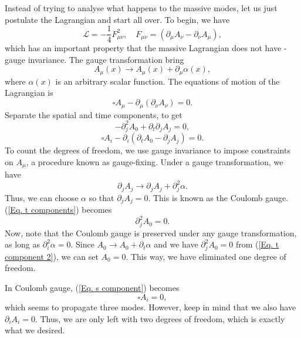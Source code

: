 \documentclass[11pt]{article}
\theoremstyle{definition}
\begin{document}
Instead of trying to analyse what happens to the massive modes, let us just postulate the Lagrangian and start all over. To begin, we have
\begin{equation}
    \mathcal{L} = -\frac{1}{4}F_{\mu\nu}^2, \quad F_{\mu\nu} = (\partial_\mu A_\nu - \partial_\nu A_\mu),
\end{equation}
which has an important property that the massive Lagrangian does not have - gauge invariance. The gauge transformation bring 
\begin{equation}
    A_\mu(x) \rightarrow A_\mu(x) + \partial_\mu\alpha(x),
\end{equation}
where $\alpha(x)$ is an arbitrary scalar function. The equations of motion of the Lagrangian is
\begin{equation}
    \square A_\mu - \partial_\mu ( \partial_\nu A_\nu) = 0. 
\end{equation}
Separate the spatial and time components, to get
\begin{equation}
    -\partial_j^2A_0 + \partial_t\partial_jA_j = 0,
    \label{Eq. t components}
\end{equation}
\begin{equation}
    \square A_i - \partial_i (\partial_t A_0 - \partial_j A_j) = 0.
    \label{Eq. s component}
\end{equation}
To count the degrees of freedom, we use gauge invariance to impose constraints on $A_\mu$, a procedure known as gauge-fixing. Under a gauge transformation, we have
\begin{equation}
    \partial_jA_j \rightarrow \partial_jA_j + \partial_j^2\alpha.
\end{equation}
Thus, we can choose $\alpha$ so that $\partial_j A_j =0$. This is known as the Coulomb gauge. (\ref{Eq. t components}) becomes
\begin{equation}
    \partial_j^2A_0 = 0.
    \label{Eq. t component 2}
\end{equation}
Now, note that the Coulomb gauge is preserved under any gauge transformation, as long as $\partial_i^2\alpha = 0$. Since $A_0 \rightarrow A_0 + \partial_t\alpha$ and we have $\partial_j^2A_0 = 0$ from (\ref{Eq. t component 2}), we can set $A_0 = 0$. This way, we have eliminated one degree of freedom. 

In Coulomb gauge, (\ref{Eq. s component}) becomes
\begin{equation}
     \square A_i = 0,
\end{equation}
which seems to propagate three modes. However, keep in mind that we also have $\partial_i A_i = 0$. Thus, we are only left with two degrees of freedom, which is exactly what we desired. 
\end{document}
